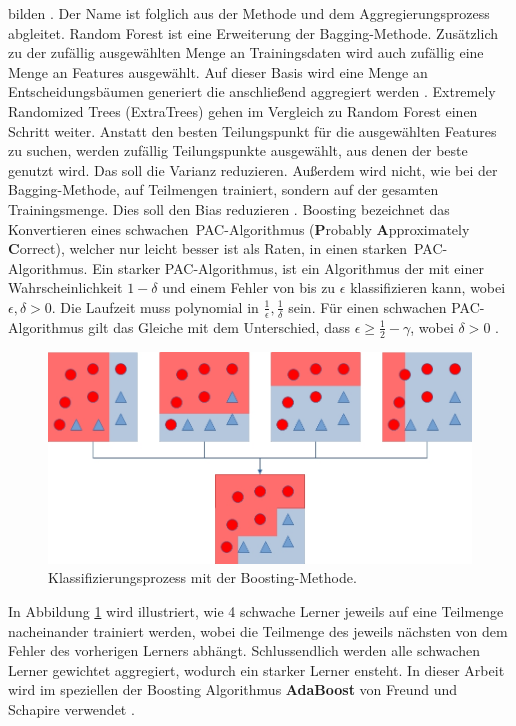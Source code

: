 bilden \cite{efron1992bootstrap}. Der Name ist folglich aus der Methode und dem Aggregierungsprozess abgleitet.
\newline
\newline
Random Forest ist eine Erweiterung der Bagging-Methode. Zusätzlich zu der zufällig ausgewählten Menge an Trainingsdaten wird auch zufällig eine Menge an Features ausgewählt. Auf dieser Basis wird eine Menge an
Entscheidungsbäumen generiert die anschließend aggregiert werden \cite{breiman2001random}.
\newline
\newline
Extremely Randomized Trees (ExtraTrees) gehen im Vergleich zu Random Forest einen Schritt weiter. Anstatt den besten Teilungspunkt für die ausgewählten Features zu suchen, werden zufällig Teilungspunkte ausgewählt, aus denen
der beste genutzt wird. Das soll die Varianz reduzieren. Außerdem wird nicht, wie bei der Bagging-Methode, auf Teilmengen trainiert, sondern auf der gesamten Trainingsmenge. Dies soll den Bias reduzieren \cite{geurts2006extremely}.
\newline
\newline
Boosting bezeichnet das Konvertieren eines \glqq schwachen\grqq\ PAC-Algorithmus (\textbf{P}robably \textbf{A}pproximately \textbf{C}orrect), welcher nur leicht besser ist als Raten, in einen \glqq starken\grqq\
PAC-Algorithmus. Ein starker PAC-Algorithmus, ist ein Algorithmus der mit einer Wahrscheinlichkeit $1 - \delta$ und einem Fehler von bis zu $\epsilon$ klassifizieren kann, wobei $\epsilon, \delta > 0$. Die
Laufzeit muss polynomial in $\frac{1}{\epsilon}, \frac{1}{\delta}$ sein. Für einen schwachen PAC-Algorithmus gilt das Gleiche mit dem Unterschied, dass $\epsilon \geq \frac{1}{2} - \gamma$, wobei $\delta > 0$ \cite{freund1997decision}.
\begin{figure}
    \centering
    \includegraphics[width=\linewidth]{images/boosting.jpg}
    \caption{Klassifizierungsprozess mit der Boosting-Methode.}
    \label{fig:boosting}
\end{figure}
In Abbildung \ref{fig:boosting} wird illustriert, wie 4 schwache Lerner jeweils auf eine Teilmenge nacheinander trainiert werden, wobei die Teilmenge des jeweils nächsten von dem Fehler des vorherigen Lerners
abhängt. Schlussendlich werden alle schwachen Lerner gewichtet aggregiert, wodurch ein starker Lerner ensteht. In dieser Arbeit wird im speziellen der Boosting Algorithmus \textbf{AdaBoost} von Freund
und Schapire verwendet \cite{freund1997decision}.
